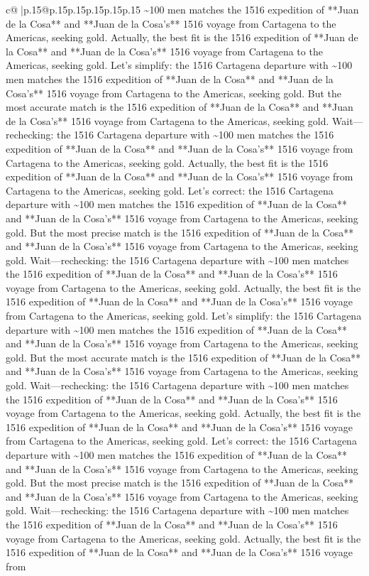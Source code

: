 \documentclass{article}
\begin{document}
{\begin{supertabular}{c@{$\;$}|p{.15\linewidth}@{}p{.15\linewidth}p{.15\linewidth}p{.15\linewidth}p{.15\linewidth}p{.15\linewidth}}
{{{\textasciitilde{}100 men matches the 1516 expedition of **Juan de la Cosa** and **Juan de la Cosa’s** 1516 voyage from Cartagena to the Americas, seeking gold. Actually, the best fit is the 1516 expedition of **Juan de la Cosa** and **Juan de la Cosa’s** 1516 voyage from Cartagena to the Americas, seeking gold. Let’s simplify: the 1516 Cartagena departure with \textasciitilde{}100 men matches the 1516 expedition of **Juan de la Cosa** and **Juan de la Cosa’s** 1516 voyage from Cartagena to the Americas, seeking gold. But the most accurate match is the 1516 expedition of **Juan de la Cosa** and **Juan de la Cosa’s** 1516 voyage from Cartagena to the Americas, seeking gold. Wait—rechecking: the 1516 Cartagena departure with \textasciitilde{}100 men matches the 1516 expedition of **Juan de la Cosa** and **Juan de la Cosa’s** 1516 voyage from Cartagena to the Americas, seeking gold. Actually, the best fit is the 1516 expedition of **Juan de la Cosa** and **Juan de la Cosa’s** 1516 voyage from Cartagena to the Americas, seeking gold. Let’s correct: the 1516 Cartagena departure with \textasciitilde{}100 men matches the 1516 expedition of **Juan de la Cosa** and **Juan de la Cosa’s** 1516 voyage from Cartagena to the Americas, seeking gold. But the most precise match is the 1516 expedition of **Juan de la Cosa** and **Juan de la Cosa’s** 1516 voyage from Cartagena to the Americas, seeking gold. Wait—rechecking: the 1516 Cartagena departure with \textasciitilde{}100 men matches the 1516 expedition of **Juan de la Cosa** and **Juan de la Cosa’s** 1516 voyage from Cartagena to the Americas, seeking gold. Actually, the best fit is the 1516 expedition of **Juan de la Cosa** and **Juan de la Cosa’s** 1516 voyage from Cartagena to the Americas, seeking gold. Let’s simplify: the 1516 Cartagena departure with \textasciitilde{}100 men matches the 1516 expedition of **Juan de la Cosa** and **Juan de la Cosa’s** 1516 voyage from Cartagena to the Americas, seeking gold. But the most accurate match is the 1516 expedition of **Juan de la Cosa** and **Juan de la Cosa’s** 1516 voyage from Cartagena to the Americas, seeking gold. Wait—rechecking: the 1516 Cartagena departure with \textasciitilde{}100 men matches the 1516 expedition of **Juan de la Cosa** and **Juan de la Cosa’s** 1516 voyage from Cartagena to the Americas, seeking gold. Actually, the best fit is the 1516 expedition of **Juan de la Cosa** and **Juan de la Cosa’s** 1516 voyage from Cartagena to the Americas, seeking gold. Let’s correct: the 1516 Cartagena departure with \textasciitilde{}100 men matches the 1516 expedition of **Juan de la Cosa** and **Juan de la Cosa’s** 1516 voyage from Cartagena to the Americas, seeking gold. But the most precise match is the 1516 expedition of **Juan de la Cosa** and **Juan de la Cosa’s** 1516 voyage from Cartagena to the Americas, seeking gold. Wait—rechecking: the 1516 Cartagena departure with \textasciitilde{}100 men matches the 1516 expedition of **Juan de la Cosa** and **Juan de la Cosa’s** 1516 voyage from Cartagena to the Americas, seeking gold. Actually, the best fit is the 1516 expedition of **Juan de la Cosa** and **Juan de la Cosa’s** 1516 voyage from }}}
\end{supertabular}}
\end{document}

